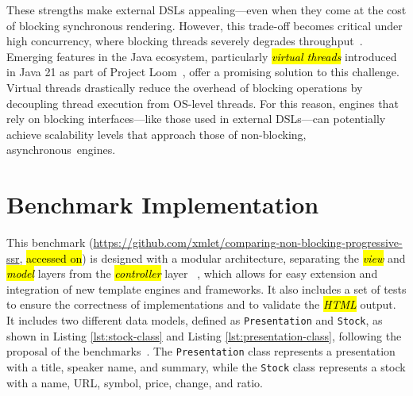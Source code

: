 \documentclass[software,article,accept,pdftex,moreauthors]{Definitions/mdpi}
\begin{document}
These strengths make external DSLs appealing---even when they come at the cost of
blocking synchronous rendering. However, this trade-off becomes critical under
high concurrency, where blocking threads severely degrades throughput~\cite{wise2024pssr}.
Emerging features in the Java ecosystem, particularly \textit{\hl{virtual threads}}
introduced in Java 21 as part of Project Loom~\cite{Veen2024}, offer a promising solution to
this challenge. Virtual threads drastically reduce the overhead of blocking
operations by decoupling thread execution from OS-level threads. For this reason,
engines that rely on blocking interfaces---like those used in
external DSLs---can potentially achieve scalability levels that approach those of
non-blocking, asynchronous~engines.




\section{Benchmark Implementation}
\label{sec:bench}

This benchmark ({\url{https://github.com/xmlet/comparing-non-blocking-progressive-ssr}}, \hl{accessed on})
is designed with a modular architecture, separating the \textit{\hl{view}} and
\textit{\hl{model}} layers from the \textit{\hl{controller}} layer ~\cite{Bucanek2009},
which allows for easy extension and integration of new template engines and
frameworks. It also includes a set of tests to ensure the correctness of
implementations and to validate the \textit{\hl{HTML}} output. It includes two
different data models, defined as \texttt{Presentation} and \texttt{Stock}, as
shown in Listing \ref{lst:stock-class} and Listing \ref{lst:presentation-class},
following the proposal of the
benchmarks~\cite{templatesbenchmark,springbenchmark}. The \texttt{Presentation}
class represents a presentation with a title, speaker name, and summary, while
the \texttt{Stock} class represents a stock with a name, URL, symbol, price,
change, and ratio.
\end{document}
